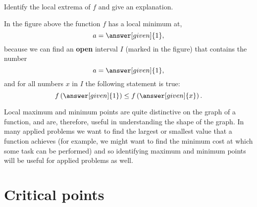 \documentclass{ximera}
\begin{document}
\begin{example}
\begin{image}
\begin{tikzpicture}
\end{tikzpicture}
\end{image}
Identify the local extrema of $f$ and give an explanation.
\begin{explanation}
In the figure above the function $f$ has a local minimum at,
\[
a=\answer[given]{1},
\]
because we can find an \textbf{open} interval $I$ (marked in the
figure) that contains the number
\[
a=\answer[given]{1},
\]
and for all numbers $x$ in $I$ the following statement is true:
 \[
f\left(\answer[given]{1}\right)\le f\left(\answer[given]{x}\right).
\]
\end{explanation}
\end{example}

Local maximum and minimum points are quite distinctive on the graph of
a function, and are, therefore, useful in understanding the shape of the
graph. In many applied problems we want to find the largest or
smallest value that a function achieves (for example, we might want
to find the minimum cost at which some task can be performed) and so
identifying maximum and minimum points will be useful for applied
problems as well.



\section{Critical points}
\end{document}

